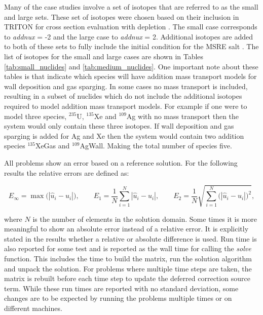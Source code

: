 Many of the case studies involve a set of isotopes that are referred to as the small and large sets. These set of isotopes were chosen based on their inclusion in TRITON for cross section evaluation with depletion \cite{scaleManual}. The small case corresponds to \textit{addnux} = -2 and the large case to \textit{addnux} = 2. Additional isotopes are added to both of these sets to fully include the initial condition for the MSRE salt \cite{MSREbenchmark}. The list of isotopes for the small and large cases are shown in Tables  \ref{tab:small_nuclides} and \ref{tab:medium_nuclides}. One important note about these tables is that indicate which species will have addition mass transport models for wall deposition and gas sparging. In some cases no mass transport is included, resulting in a subset of nuclides which do not include the additional isotopes required to model addition mass transport models. For example if one were to model three species, ${}^{235}$U, ${}^{135}$Xe and ${}^{109}$Ag with no mass transport then the system would only contain these three isotopes. If wall deposition and gas sparging is added for Ag and Xe then the system would contain two addition species ${}^{135}$XeGas and ${}^{109}$AgWall. Making the total number of species five. 

All problems show an error based on a reference solution. For the following results the relative errors are defined as:

\begin{equation*}
    E_{\infty} = \max\bigg(|\hat{u}_{i} - u_{i}|\bigg),  \quad \quad E_{1} = \frac{1}{N}\sum_{i=1}^{N}|\hat{u}_{i} - u_{i}|, \quad \quad E_{2} = \frac{1}{N}\sqrt{\sum_{i=1}^{N}\bigg(|\hat{u}_{i} - u_{i}|\bigg)^{2}},
\end{equation*}


\noindent where $N$ is the number of elements in the solution domain. Some times it is more meaningful to show an absolute error instead of a relative error. It is explicitly stated in the results whether a relative or absolute difference is used. Run time is also reported for some test and is reported as the wall time for calling the \textit{solve} function. This includes the time to build the matrix, run the solution algorithm and unpack the solution. For problems where multiple time steps are taken, the matrix is rebuilt before each time step to update the deferred correction source term. While these run times are reported with no standard deviation, some changes are to be expected by running the problems multiple times or on different machines. 


